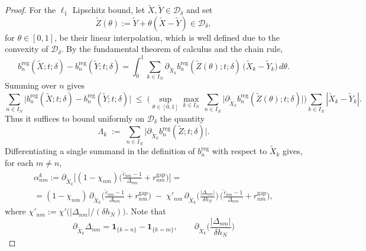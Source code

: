 \documentclass[12pt,reqno]{amsart}
\theoremstyle{plain}
\theoremstyle{definition}
\theoremstyle{remark}
\begin{document}
\begin{proof}
For the $\ell_1$ Lipschitz bound, let $\widetilde X,\widetilde Y\in\mathcal D_\delta$ and set
\begin{equation}
\widetilde Z(\theta):=\widetilde Y+\theta(\widetilde X-\widetilde Y) \in \mathcal{D}_{\delta},
\end{equation} for
$\theta\in[0,1]$, be their linear interpolation, which is well defined due to the convexity of $\mathcal{D}_{\delta}$. By the fundamental theorem of calculus and the chain rule,
\begin{equation}
b^{\mathrm{reg}}_{n}(\widetilde X;t;\delta)-b^{\mathrm{reg}}_{n}(\widetilde Y;t;\delta)
=\int_0^1\sum_{k\in I_N}
\partial_{\widetilde X_k} b^{\mathrm{reg}}_{n}(\widetilde Z(\theta);t;\delta)\,
\big(\widetilde X_k-\widetilde Y_k\big)\,d\theta .
\end{equation}
Summing over $n$ gives
\begin{equation}\label{eq:FToC}
\sum_{n\in I_N}\big|b^{\mathrm{reg}}_{n}(\widetilde X;t;\delta)
-b^{\mathrm{reg}}_{n}(\widetilde Y;t;\delta)\big|
\;\le\; \Big(\sup_{\theta\in[0,1]}
\max_{k\in I_N}\,\sum_{n\in I_N}
\big|\partial_{\widetilde X_k} b^{\mathrm{reg}}_{n}(\widetilde Z(\theta);t;\delta)\big|\Big)
\sum_{k\in I_N}|\widetilde X_k-\widetilde Y_k|.
\end{equation}
Thus it suffices to bound uniformly on $\mathcal D_\delta$ the quantity
\begin{equation}
\Lambda_{k}\;:=\;\sum_{n\in I_N}
\big|\partial_{\widetilde X_k} b^{\mathrm{reg}}_{n}(\widetilde Z;t;\delta)\big|.
\end{equation}
\noindent
Differentiating a single summand in the definition of $b^{\mathrm{reg}}_{n}$ with
respect to $\widetilde X_k$ gives, for each $m\neq n$,
\begin{multline}\label{eq:def-alpha}
\alpha_{nm}^k
:=\partial_{\widetilde X_k}\!\Big[
(1-\chi_{nm})\Big(\frac{\widetilde c_{nm}-1}{\Delta_{nm}}
+ r^{\mathrm{gap}}_{nm}\Big)\Big]=\\
=(1-\chi_{nm})\,
\partial_{\widetilde X_k}\!\Big(\frac{\widetilde c_{nm}-1}{\Delta_{nm}}
+ r^{\mathrm{gap}}_{nm}\Big)
\;-\;\chi'_{nm}\,
\partial_{\widetilde X_k}\!\Big(\frac{|\Delta_{nm}|}{\delta h_N}\Big)\,
\Big(\frac{\widetilde c_{nm}-1}{\Delta_{nm}}+ r^{\mathrm{gap}}_{nm}\Big),
\end{multline}
where $\chi'_{nm}:=\chi'\!\big(|\Delta_{nm}|/(\delta h_N)\big)$.  Note that
\begin{equation}\label{eq:derivs-Delta}
\partial_{\widetilde X_k}\Delta_{nm}=\mathbf{1}_{\{k=n\}}-\mathbf{1}_{\{k=m\}},
\qquad
\partial_{\widetilde X_k}\!\Big(\frac{|\Delta_{nm}|}{\delta h_N}\Big)

\end{equation}
\end{proof}
\end{document}
